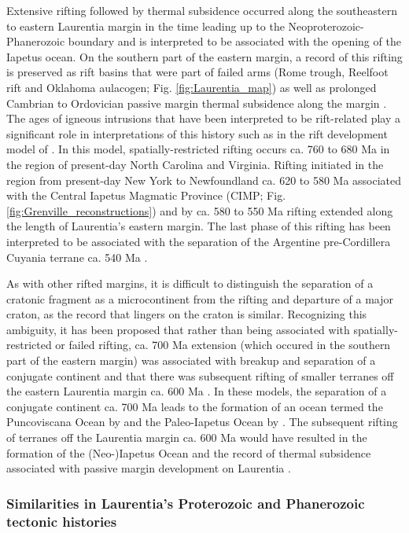 \documentclass[twocolumn, switch]{article} %
\begin{document}
Extensive rifting followed by thermal subsidence occurred along the southeastern to eastern Laurentia margin in the time leading up to the Neoproterozoic-Phanerozoic boundary and is interpreted to be associated with the opening of the Iapetus ocean. On the southern part of the eastern margin, a record of this rifting is preserved as rift basins that were part of failed arms (Rome trough, Reelfoot rift and Oklahoma aulacogen; Fig. \ref{fig:Laurentia_map}) as well as prolonged Cambrian to Ordovician passive margin thermal subsidence along the margin \citep{Bond1984a, Whitmeyer2007a}. The ages of igneous intrusions that have been interpreted to be rift-related play a significant role in interpretations of this history such as in the rift development model of \citet{Burton2010a}. In this model, spatially-restricted rifting occurs ca. 760 to 680 Ma in the region of present-day North Carolina and Virginia. Rifting initiated in the region from present-day New York to Newfoundland ca. 620 to 580 Ma associated with the Central Iapetus Magmatic Province (CIMP; Fig. \ref{fig:Grenville_reconstructions}) and by ca. 580 to 550 Ma rifting extended along the length of Laurentia's eastern margin. The last phase of this rifting has been interpreted to be associated with the separation of the Argentine pre-Cordillera Cuyania terrane ca. 540 Ma \citep{Dickerson1998a, Martin2019a}.

As with other rifted margins, it is difficult to distinguish the separation of a cratonic fragment as a microcontinent from the rifting and departure of a major craton, as the record that lingers on the craton is similar. Recognizing this ambiguity, it has been proposed that rather than being associated with spatially-restricted or failed rifting, ca. 700 Ma extension (which occured in the southern part of the eastern margin) was associated with breakup and separation of a conjugate continent and that there was subsequent rifting of smaller terranes off the eastern Laurentia margin ca. 600 Ma \citep{Chew2008a, Escayola2011a, Robert2020a}. In these models, the separation of a conjugate continent ca. 700 Ma leads to the formation of an ocean termed the Puncoviscana Ocean by \citet{Escayola2011a} and the Paleo-Iapetus Ocean by \citet{Robert2020a}. The subsequent rifting of terranes off the Laurentia margin ca. 600 Ma would have resulted in the formation of the (Neo-)Iapetus Ocean and the record of thermal subsidence associated with passive margin development on Laurentia \citep{Escayola2011a, Robert2020a}.

\subsubsection{Similarities in Laurentia's Proterozoic and Phanerozoic tectonic histories}
\end{document}
